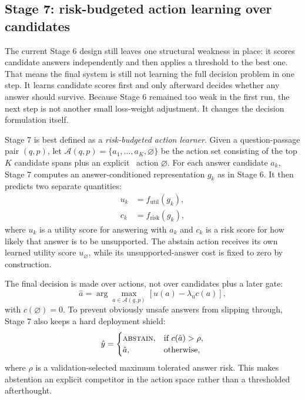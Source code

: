 \subsection{Stage 7: risk-budgeted action learning over candidates}

The current Stage 6 design still leaves one structural weakness in place:
it scores candidate answers independently and then applies a threshold to the
best one.
That means the final system is still not learning the full decision problem in
one step.
It learns candidate scores first and only afterward decides whether any answer
should survive.
Because Stage 6 remained too weak in the first run, the next step is not
another small loss-weight adjustment.
It changes the decision formulation itself.

Stage 7 is best defined as a \emph{risk-budgeted action learner}.
Given a question-passage pair \((q,p)\), let
\(\mathcal{A}(q,p)=\{a_1,\dots,a_K,\varnothing\}\)
be the action set consisting of the top \(K\) candidate spans plus an explicit
\abstain\ action \(\varnothing\).
For each answer candidate \(a_k\), Stage 7 computes an answer-conditioned
representation \(g_k\) as in Stage 6.
It then predicts two separate quantities:
\begin{align}
  u_k &= f_{\mathrm{util}}(g_k), \\
  c_k &= f_{\mathrm{risk}}(g_k),
\end{align}
where \(u_k\) is a utility score for answering with \(a_k\) and \(c_k\) is a
risk score for how likely that answer is to be unsupported.
The abstain action receives its own learned utility score
\(u_{\varnothing}\),
while its unsupported-answer cost is fixed to zero by construction.

The final decision is made over actions, not over candidates plus a later gate:
\begin{equation}
  \hat{a}
  =
  \arg\max_{a \in \mathcal{A}(q,p)}
  \left[
    u(a) - \lambda_{\mathrm{u}} c(a)
  \right],
\end{equation}
with \(c(\varnothing)=0\).
To prevent obviously unsafe answers from slipping through, Stage 7 also keeps a
hard deployment shield:
\begin{equation}
  \hat{y}
  =
  \begin{cases}
    \textsc{abstain}, & \text{if } c(\hat{a}) > \rho, \\
    \hat{a}, & \text{otherwise,}
  \end{cases}
\end{equation}
where \(\rho\) is a validation-selected maximum tolerated answer risk.
This makes abstention an explicit competitor in the action space rather than a
thresholded afterthought.

